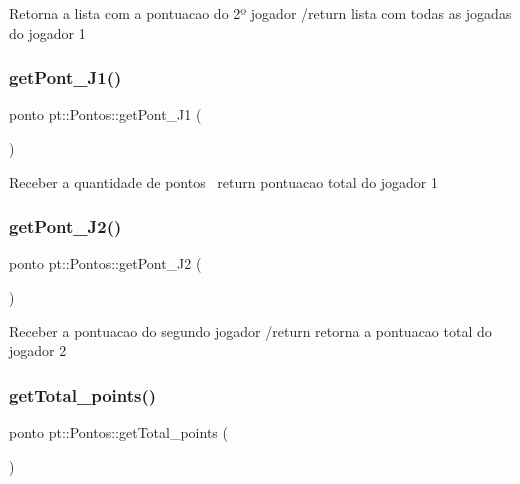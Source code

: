 Retorna a lista com a pontuacao do 2º jogador /return lista com todas as jogadas do jogador 1 \mbox{\label{structpt_1_1Pontos_aca27962e49470015527855c33c30f610}} 
\subsubsection{\texorpdfstring{get\+Pont\+\_\+\+J1()}{getPont\_J1()}}
{\footnotesize\ttfamily ponto pt\+::\+Pontos\+::get\+Pont\+\_\+\+J1 (\begin{DoxyParamCaption}{ }\end{DoxyParamCaption})\hspace{0.3cm}{\ttfamily [inline]}}

Receber a quantidade de pontos~\newline
return pontuacao total do jogador 1 \mbox{\label{structpt_1_1Pontos_a2cdd460251585196e1c151bcb05fbe59}} 
\subsubsection{\texorpdfstring{get\+Pont\+\_\+\+J2()}{getPont\_J2()}}
{\footnotesize\ttfamily ponto pt\+::\+Pontos\+::get\+Pont\+\_\+\+J2 (\begin{DoxyParamCaption}{ }\end{DoxyParamCaption})\hspace{0.3cm}{\ttfamily [inline]}}

Receber a pontuacao do segundo jogador /return retorna a pontuacao total do jogador 2 \mbox{\label{structpt_1_1Pontos_adb5354ee1ca6f4a0196c3afa401b50d7}} 
\subsubsection{\texorpdfstring{get\+Total\+\_\+points()}{getTotal\_points()}}
{\footnotesize\ttfamily ponto pt\+::\+Pontos\+::get\+Total\+\_\+points (\begin{DoxyParamCaption}{ }\end{DoxyParamCaption})\hspace{0.3cm}{\ttfamily [inline]}}


